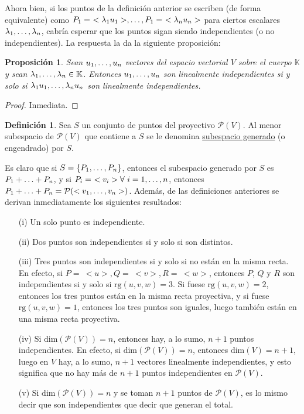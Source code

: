 \documentclass[12pt]{report}
\newtheorem{proposition}{Proposición}[chapter]
\theoremstyle{definition}
\newtheorem{definition}{Definición}[chapter]
\theoremstyle{definition}
\theoremstyle{remark}
\begin{document}
Ahora bien, si los puntos de la definición anterior se escriben (de forma equivalente) como $P_1 = \ < \lambda_1 u_1 >, \mathellipsis, P_1 = \ < \lambda_n u_n >$ para ciertos escalares $\lambda_1,\mathellipsis,\lambda_n$, cabría esperar que los puntos sigan siendo independientes (o no independientes). La respuesta la da la siguiente proposición:

\begin{proposition}
Sean $u_1,\mathellipsis,u_n$ vectores del espacio vectorial $V$ sobre el cuerpo $\mathbb{K}$ y sean $\lambda_1,\mathellipsis,\lambda_n \in \mathbb{K}$. Entonces $u_1,\mathellipsis,u_n$ son linealmente independientes si y solo si $\lambda_1 u_1,\mathellipsis, \lambda_n u_n$ son linealmente independientes.
\end{proposition}

\begin{proof}
    Inmediata.
\end{proof}

\begin{definition}
    Sea $S$ un conjunto de puntos del proyectivo $\mathcal{P}(V)$. Al menor subespacio de $\mathcal{P}(V)$ que contiene a $S$ se le denomina \ul{subespacio generado} (o engendrado) por $S$.
\end{definition}

Es claro que si $S =\{P_1,\mathellipsis,P_n\}$, entonces el subespacio generado por $S$ es $P_1 + \mathellipsis + P_n$, y si $P_i = \ <v_i>  \forall \ i = 1,\mathellipsis,n$, entonces $P_1 + \mathellipsis + P_n = \mathcal{P}(<v_1,\mathellipsis,v_n>)$. Además, de las definiciones anteriores se derivan inmediatamente los siguientes resultados:

\begin{itemize}
    \item[(i)] Un solo punto es independiente.
    \item[(ii)] Dos puntos son independientes si y solo si son distintos.
    \item[(iii)] Tres puntos son independientes si y solo si no están en la misma recta. En efecto, si $P = \ <u>, Q = \ <v>, R = \ <w>$, entonces $P$, $Q$ y $R$ son independientes si y solo si $\mathrm{rg}(u,v,w) = 3$. Si fuese $\mathrm{rg}(u,v,w) = 2$, entonces los tres puntos están en la misma recta proyectiva, y si fuese $\mathrm{rg}(u,v,w) = 1$, entonces los tres puntos son iguales, luego también están en una misma recta proyectiva.
    \item[(iv)] Si $\mathrm{dim}(\mathcal{P}(V)) = n$, entonces hay, a lo sumo, $n+1$ puntos independientes. En efecto, si $\mathrm{dim}(\mathcal{P}(V)) = n$, entonces $\mathrm{dim}(V) = n+1$, luego en $V$ hay, a lo sumo, $n+1$ vectores linealmente independientes, y esto significa que no hay más de $n+1$ puntos independientes en $\mathcal{P}(V)$.
    \item[(v)] Si $\mathrm{dim}(\mathcal{P}(V)) = n$ y se toman $n+1$ puntos de $\mathcal{P}(V)$, es lo mismo decir que son independientes que decir que generan el total.
\end{itemize}
\end{document}
